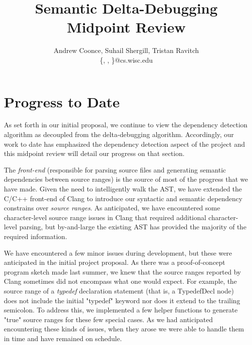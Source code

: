 \documentclass[11pt]{article}
\title{Semantic Delta-Debugging\\
Midpoint Review}
\author{Andrew Coonce, Suhail Shergill, Tristan Ravitch \\
\{\mailto{coonce}, \mailto{shergill}, \mailto{travitch}\}@cs.wisc.edu
}
\begin{document}
\maketitle

\section{Progress to Date}
As set forth in our initial proposal, we continue to view the dependency
detection algorithm as decoupled from the delta-debugging
algorithm. Accordingly, our work to date has emphasized the dependency detection
aspect of the project and this midpoint review will detail our progress on that
section.

The \emph{front-end} (responsible for parsing source files and generating
semantic dependencies between source ranges) is the source of most of the
progress that we have made. Given the need to intelligently walk the AST, we
have extended the C/C++ front-end of Clang to introduce our syntactic and
semantic dependency constrains over \emph{source ranges}. As anticipated, we
have encountered some character-level source range issues in Clang that required
additional character-level parsing, but by-and-large the existing AST has
provided the majority of the required information.

We have encountered a few minor issues during development, but these were
anticipated in the initial project proposal. As there was a proof-of-concept
program sketch made last summer, we knew that the source ranges reported by
Clang \citep{clang} sometimes did not encompass what one would expect. For
example, the source range of a \emph{typedef} declaration statement (that is, a
TypedefDecl node) does not include the initial "typedef" keyword nor does it
extend to the trailing semicolon. To address this, we implemented a few helper
functions to generate "true" source ranges for these few special cases. As we
had anticipated encountering these kinds of issues, when they arose we were able
to handle them in time and have remained on schedule.
\end{document}

